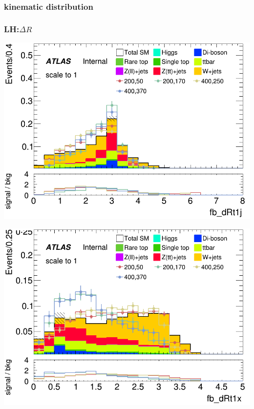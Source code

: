 \documentclass[usenames,dvipsnames]{beamer}
\begin{document}
\begin{frame}
  \frametitle{kinematic distribution}
  \frametitle{LH:$\Delta R$}
    \begin{minipage}{0.32\textwidth}
        \centering
        \includegraphics[width=\textwidth]{graphics/LH_met_sig/LH_fb_dRt1j_norm.png}
    \end{minipage}
    \hfill
    \begin{minipage}{0.32\textwidth}
        \centering
        \includegraphics[width=\textwidth]{graphics/LH_met_sig/LH_fb_dRt1x_norm.png}
    \end{minipage}
    \hfill
    \begin{minipage}{0.32\textwidth}
        \centering

\end{minipage}
\end{frame}
\end{document}

